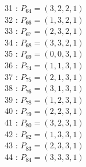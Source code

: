 \documentclass{article}
\begin{document}
{\begin{multicols}{3}
31 : $P_{64}=( 3, 2, 2, 1 )$\\
32 : $P_{66}=( 1, 3, 2, 1 )$\\
33 : $P_{67}=( 2, 3, 2, 1 )$\\
34 : $P_{68}=( 3, 3, 2, 1 )$\\
35 : $P_{69}=( 0, 0, 3, 1 )$\\
36 : $P_{74}=( 1, 1, 3, 1 )$\\
37 : $P_{75}=( 2, 1, 3, 1 )$\\
38 : $P_{76}=( 3, 1, 3, 1 )$\\
39 : $P_{78}=( 1, 2, 3, 1 )$\\
40 : $P_{79}=( 2, 2, 3, 1 )$\\
41 : $P_{80}=( 3, 2, 3, 1 )$\\
42 : $P_{82}=( 1, 3, 3, 1 )$\\
43 : $P_{83}=( 2, 3, 3, 1 )$\\
44 : $P_{84}=( 3, 3, 3, 1 )$\\
\end{multicols}


%


%


}%
\end{document}

